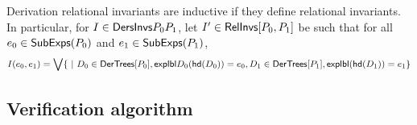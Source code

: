 %
Derivation relational invariants are inductive if they define
relational invariants.
%
In particular, for $I \in \mathsf{DersInvs}{P_0}{P_1}$, let $I' \in
\mathsf{RelInvs}[ P_0, P_1 ]$ be such that for all $e_0 \in \mathsf{SubExps}(P_0)$ and
$e_1 \in \mathsf{SubExps}(P_1)$,
\[ I(e_0, e_1) = %
\biglor \setformer{}{ D_0 \in \dertrees{P_0}, %
  \explabel{D_0}(\head(D_0)) = e_0, %
  D_1 \in \dertrees{P_1}, %
  \explabel(\head(D_1)) = e_1 } \]

\subsection{Verification algorithm}
\label{sec:verifier}
\begin{algorithm}[t]
  {  \label{line:aux-end} %
    \Return{$\verifyaux((\emptyset, \emptyset), %
      (\emptyset, \emptyset), \emptyset)$} \label{line:base-call} } %
  \caption{%
    \verify: given $P_0, P_1 \in \stlc$, decides if $P_0 \equiv P_1$.
    \verify uses procedures \mergeinvs (\autoref{sec:verifier}), %
    \chkinductive (\autoref{sec:chk-ind}), and %
    \verifyders (\autoref{sec:verify-ders}).
  }
  \label{alg:verify}
\end{algorithm}
%
%

